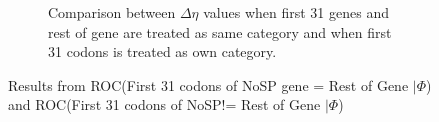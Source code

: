 \documentclass[11pt]{labbook}
\begin{document}
\begin{figure}
\begin{subfigure}{0.52\textwidth}
\caption{Comparison between $\Delta\eta$ values when first 31 genes and rest of gene are treated as same category and when first 31 codons is treated as own category.}
\end{subfigure}
\caption{Results from ROC(First 31 codons of NoSP gene = Rest of Gene $|\Phi$) and ROC(First 31 codons of NoSP!= Rest of Gene $|\Phi$)}
\end{figure}
\end{document}
